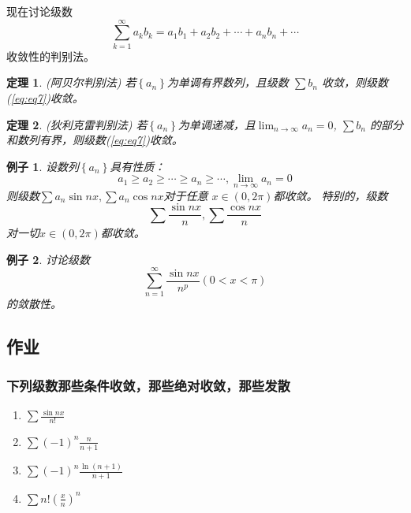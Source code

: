 \documentclass[a4paper,12pt]{article}
\newtheorem{theorem}{定理}
\newtheorem{example}{例子}
\let\oldref\ref
\renewcommand{\ref}[1]{\rm{(\oldref{#1})}}
\begin{document}
现在讨论级数
\begin{equation}
    \sum_{k=1}^{\infty} a_kb_k  = a_1b_1 + a_2b_2 + \cdots + a_nb_n  + \cdots
    \label{eq:eq7}
\end{equation}
收敛性的判别法。

\begin{theorem}{\rm (阿贝尔判别法)}
    若$\displaystyle \left\{a_n\right\}$为单调有界数列，且级数
    $\displaystyle \sum b_n$ 收敛，则级数\ref{eq:eq7}收敛。
\end{theorem}

\begin{theorem}{\rm (狄利克雷判别法)}
    若$\displaystyle \left\{a_n\right\}$为单调递减，且$\displaystyle \lim_{n \to \infty} a_n = 0$, 
    $\displaystyle \sum b_n$ 的部分和数列有界，则级数\ref{eq:eq7}收敛。
\end{theorem}

\begin{example}
    设数列$\displaystyle \left\{a_n\right\}$具有性质：
    \[
        a_1 \ge a_2 \ge \cdots \ge a_n \ge \cdots, \lim_{n \to \infty} a_n = 0
        \]
     则级数$\displaystyle \sum a_n \sin nx, \sum a_n \cos nx$对于任意 
     $x \in (0, 2\pi)$都收敛。
     特别的，级数
    \[
        \sum\frac{\sin nx}{n}, \sum\frac{\cos nx}{n}
        \]
    对一切$x \in (0, 2\pi)$都收敛。
\end{example}

\begin{example}
    讨论级数
    \[
        \sum_{n=1}^{\infty} \frac{\sin nx}{n^p}(0 < x < \pi)
        \]
    的敛散性。
\end{example}

\subsection{作业}
\subsubsection{下列级数那些条件收敛，那些绝对收敛，那些发散}
\begin{enumerate}[label={\rm(\arabic*)}]
    \item $\displaystyle \sum \frac{\sin nx}{n!}$
    \item $\displaystyle \sum (-1)^n\frac{n}{n+1}$
    \item $\displaystyle \sum (-1)^n\frac{\ln (n+1)}{n+1}$
    \item $\displaystyle \sum n! \left(\frac{x}{n}\right)^n$
\end{enumerate}
\end{document}
